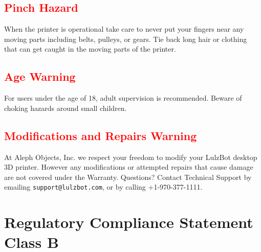 \subsection{\textcolor{red}{Pinch Hazard}}

When the printer is operational take care to never put your fingers near any moving parts including belts, pulleys, or gears. Tie back long hair or clothing that can get caught in the moving parts of the printer.

\subsection{\textcolor{red}{Age Warning}}

For users under the age of 18, adult supervision is recommended. Beware of choking hazards around small children.

\subsection{\textcolor{red}{Modifications and Repairs Warning}}

At Aleph Objects, Inc. we respect your freedom to modify your LulzBot desktop 3D printer. However any modifications or attempted repairs that cause damage are not covered under the Warranty. Questions? Contact Technical Support by emailing \texttt{support@lulzbot.com}, or by calling +1-970-377-1111.


\section{Regulatory Compliance Statement Class B}
